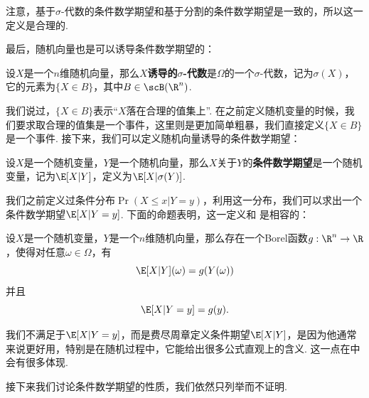 注意，基于$\sigma$-代数的条件数学期望和基于分割的条件数学期望是一致的，所以这一定义是合理的. 

最后，随机向量也是可以诱导条件数学期望的：

\begin{definition}
设$X$是一个$n$维随机向量，那么\textbf{$X$诱导的$\sigma$-代数}是$\Omega$的一个$\sigma$-代数，记为$\sigma(X)$，它的元素为$\{X\in B\}$，其中$B\in\scB(\R^n)$.
\end{definition}

我们说过，$\{X\in B\}$表示“$X$落在合理的值集上”. 在之前定义随机变量的时候，我们要求取合理的值集是一个事件，这里则是更加简单粗暴，我们直接定义$\{X\in B\}$是一个事件. 接下来，我们可以定义随机向量诱导的条件数学期望：

\begin{definition}[随机向量诱导的条件数学期望]\label{def:conditional-expectation-vector}
设$X$是一个随机变量，$Y$是一个随机向量，那么$X$关于$Y$的\textbf{条件数学期望}是一个随机变量，记为$\E[X|Y]$，定义为$\E[X|\sigma(Y)]$.
\end{definition}

我们之前定义过条件分布$\Pr(X\leq x|Y=y)$，利用这一分布，我们可以求出一个条件数学期望$\E[X|Y=y]$. 下面的命题表明，这一定义和 是相容的：

\begin{proposition}\label{prop:conditional-expectation-vector}
    设$X$是一个随机变量，$Y$是一个$n$维随机向量，那么存在一个Borel函数$g:\R^n\to\R$，使得对任意$\omega\in\Omega$，有
    \[\E[X|Y](\omega)=g(Y(\omega))\]
    并且
    \[\E[X|Y=y]=g(y).\]
\end{proposition}

我们不满足于$\E[X|Y=y]$，而是费尽周章定义条件期望$\E[X|Y]$，是因为他通常来说更好用，特别是在随机过程中，它能给出很多公式直观上的含义. 这一点在中会有很多体现. 

接下来我们讨论条件数学期望的性质，我们依然只列举而不证明. 

